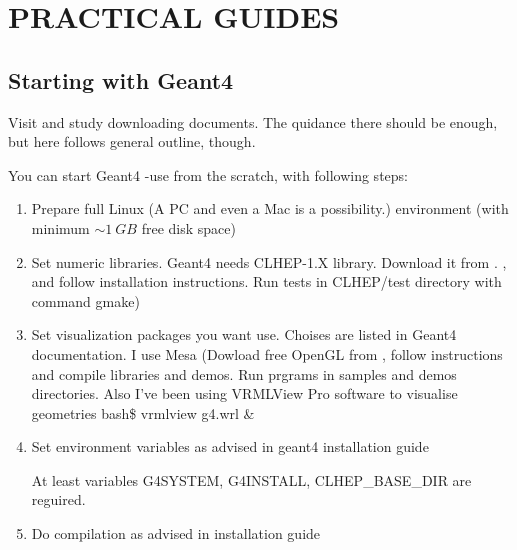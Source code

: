 \section{PRACTICAL GUIDES}

\subsection{Starting with {\sc Geant4}}
 
Visit 
and study downloading documents. The quidance there should be enough, but here follows general outline, though.


You can start {\sc Geant4} -use from the scratch, with following steps:
 
\begin{enumerate}

\item Prepare full Linux (A PC and even a Mac is a possibility.) environment (with minimum $\sim 1~GB$ free disk space)
 
\item Set numeric libraries. {\sc Geant4} needs CLHEP-1.X library.
Download it from . , and follow installation instructions. 
Run tests in {\sf CLHEP/test} directory with command {\sf gmake})
 
\item Set visualization packages you want use. Choises are listed in {\sc Geant4} documentation.
I use Mesa (Dowload free OpenGL from  , follow instructions and compile libraries and demos. 
Run prgrams in samples and demos directories. 
Also I've been using VRMLView Pro software to visualise geometries {\sf bash\$ vrmlview g4.wrl \&}
 
\item Set environment variables as advised in geant4 installation guide

At least variables {\sf G4SYSTEM, G4INSTALL, CLHEP\_BASE\_DIR} are reguired.
 
\item Do compilation as advised in installation guide
 

\end{enumerate}

